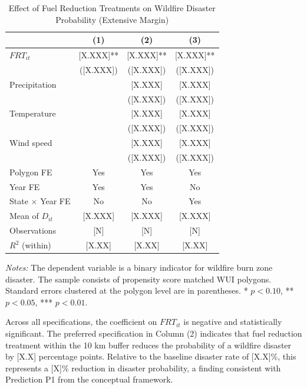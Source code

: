 \documentclass[12pt, letterpaper]{article}
\begin{document}
\begin{table}[H]
\centering
\small
\begin{threeparttable}
\caption{Effect of Fuel Reduction Treatments on Wildfire Disaster Probability (Extensive Margin)}
\label{tab:extensive}
\begin{tabular}{lccc}
\toprule
& (1) & (2) & (3) \\
\midrule
$FRT_{it}$ & [X.XXX]** & [X.XXX]** & [X.XXX]** \\
& ([X.XXX]) & ([X.XXX]) & ([X.XXX]) \\
[0.5em]
Precipitation & & [X.XXX] & [X.XXX] \\
& & ([X.XXX]) & ([X.XXX]) \\
Temperature & & [X.XXX] & [X.XXX] \\
& & ([X.XXX]) & ([X.XXX]) \\
Wind speed & & [X.XXX] & [X.XXX] \\
& & ([X.XXX]) & ([X.XXX]) \\
\midrule
Polygon FE & Yes & Yes & Yes \\
Year FE & Yes & Yes & No \\
State $\times$ Year FE & No & No & Yes \\
Mean of $D_{it}$ & [X.XXX] & [X.XXX] & [X.XXX] \\
Observations & [N] & [N] & [N] \\
$R^2$ (within) & [X.XX] & [X.XX] & [X.XX] \\
\bottomrule
\end{tabular}
\begin{tablenotes}
\small
\item \textit{Notes:} The dependent variable is a binary indicator for wildfire burn zone disaster. The sample consists of propensity score matched WUI polygons. Standard errors clustered at the polygon level are in parentheses. * $p<0.10$, ** $p<0.05$, *** $p<0.01$.
\end{tablenotes}
\end{threeparttable}
\end{table}

Across all specifications, the coefficient on $FRT_{it}$ is negative and statistically significant. The preferred specification in Column (2) indicates that fuel reduction treatment within the 10 km buffer reduces the probability of a wildfire disaster by [X.X] percentage points. Relative to the baseline disaster rate of [X.X]\%, this represents a [X]\% reduction in disaster probability, a finding consistent with Prediction P1 from the conceptual framework.
\end{document}
